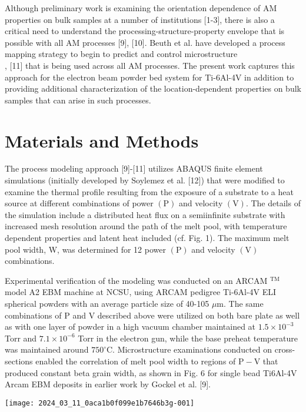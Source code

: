 \documentclass[10pt]{article}
\begin{document}
Although preliminary work is examining the orientation dependence of AM properties on bulk samples at a number of institutions [1-3], there is also a critical need to understand the processing-structure-property envelope that is possible with all AM processes [9], [10]. Beuth et al. have developed a process mapping strategy to begin to predict and control microstructure\\
[10], [11] that is being used across all AM processes. The present work captures this approach for the electron beam powder bed system for Ti-6Al-4V in addition to providing additional characterization of the location-dependent properties on bulk samples that can arise in such processes.

\section*{Materials and Methods}
The process modeling approach [9]-[11] utilizes ABAQUS finite element simulations (initially developed by Soylemez et al. [12]) that were modified to examine the thermal profile resulting from the exposure of a substrate to a heat source at different combinations of power $(\mathrm{P})$ and velocity $(\mathrm{V})$. The details of the simulation include a distributed heat flux on a semiinfinite substrate with increased mesh resolution around the path of the melt pool, with temperature dependent properties and latent heat included (cf. Fig. 1). The maximum melt pool width, W, was determined for 12 power $(\mathrm{P})$ and velocity $(\mathrm{V})$ combinations.

Experimental verification of the modeling was conducted on an ARCAM ${ }^{\mathrm{TM}}$ model A2 EBM machine at NCSU, using ARCAM pedigree Ti-6Al-4V ELI spherical powders with an average particle size of 40-105 $\mu \mathrm{m}$. The same combinations of $\mathrm{P}$ and $\mathrm{V}$ described above were utilized on both bare plate as well as with one layer of powder in a high vacuum chamber maintained at $1.5 \times 10^{-3}$ Torr and $7.1 \times 10^{-6}$ Torr in the electron gun, while the base preheat temperature was maintained around $750^{\circ} \mathrm{C}$. Microstructure examinations conducted on cross-sections enabled the correlation of melt pool width to regions of $\mathrm{P}-\mathrm{V}$ that produced constant beta grain width, as shown in Fig. 6 for single bead Ti6Al-4V Arcam EBM deposits in earlier work by Gockel et al. [9].

\begin{center}
\texttt{[image: 2024\_03\_11\_0aca1b0f099e1b7646b3g-001]}
\end{center}
\end{document}
